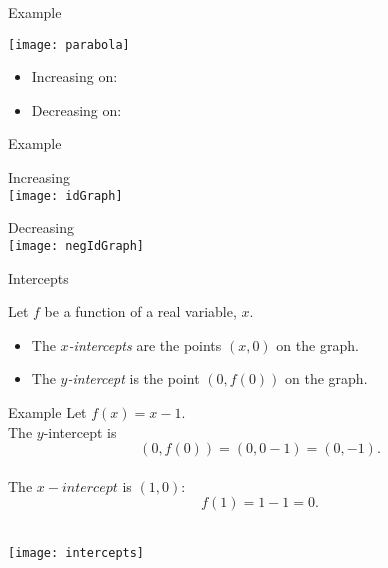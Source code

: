 \documentclass[Lecture.tex]{subfiles}
\begin{document}
\begin{frame}{Example}
  \begin{center}
    \texttt{[image: parabola]}
  \end{center}
  \begin{itemize}
  \item<2->
    Increasing on: 
  \item<2->
    Decreasing on: 
  \end{itemize}
\end{frame}

\begin{frame}{Example}
  \begin{multicols}{2}
    
  \begin{center}
    Increasing\\
    \texttt{[image: idGraph]}
  \end{center}
  \columnbreak
  \pause
  \begin{center}
    Decreasing\\
    \texttt{[image: negIdGraph]}
  \end{center}
  \end{multicols}
\end{frame}

\begin{frame}{Intercepts}
  \begin{defn}
    Let $f$ be a function of a real variable, $x$.
    \begin{itemize}
      \item<2->
        The {\it $x$-intercepts} are the points $(x,0)$ on the graph.
      \item<3->
        The {\it $y$-intercept} is the point $(0,f(0))$ on the graph.
    \end{itemize}
  \end{defn}
\end{frame}

\begin{frame}{Example}
  Let $f(x) = x - 1$.\\
  \pause
  The $y$-intercept is
  $$(0,f(0)) = (0, 0 - 1) = (0,-1).$$\\
  \pause
  The $x-intercept$ is $(1,0)$:
  $$f(1) = 1 - 1 = 0.$$\\
  \pause
  \begin{center}
    \texttt{[image: intercepts]}
  \end{center}
\end{frame}
\end{document}

